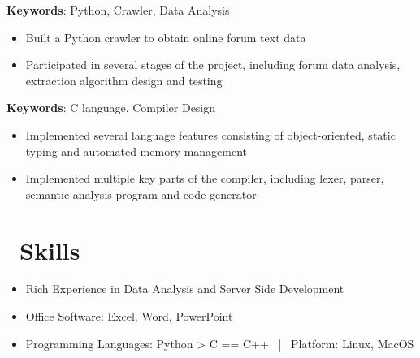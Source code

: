 \documentclass{resume}
\begin{document}
\textbf{Keywords}: Python, Crawler, Data Analysis
\begin{itemize}
  \item Built a Python crawler to obtain online forum text data
  \item Participated in several stages of the project, including forum data analysis, extraction algorithm design and testing
\end{itemize}

\textbf{Keywords}: C language, Compiler Design
\begin{itemize}
  \item Implemented several language features consisting of object-oriented, static typing and automated memory management
  \item Implemented multiple key parts of the compiler, including lexer, parser, semantic analysis program and code generator
\end{itemize}


\section{\faCogs\ Skills}
\begin{itemize}[parsep=0.5ex]
  \item Rich Experience in Data Analysis and Server Side Development
  \item Office Software: Excel, Word, PowerPoint
  \item Programming Languages: Python > C == C++ \ | \ Platform: Linux, MacOS
\end{itemize}


%
%
\end{document}
